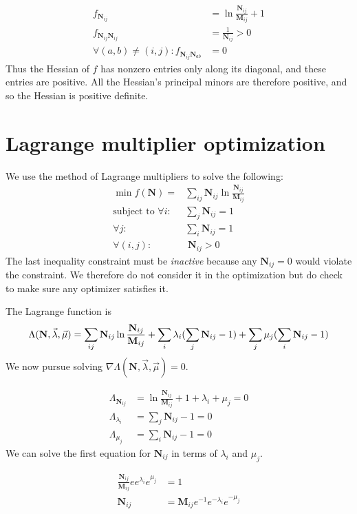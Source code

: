 \documentclass[10pt,a4paper]{article}
\newcommand{\matr}[1]{\mathbf{#1}} %
\DeclarePairedDelimiter{\paren}{(}{)}
\begin{document}
\begin{align*}
f_{\matr{N}_{ij}} &= \ln{\frac{\matr{N}_{ij}}{\matr{M}_{ij}}} + 1 \\
f_{\matr{N}_{ij}\matr{N}_{ij}} &= \frac{1}{\matr{N}_{ij}} > 0\\
\forall (a,b) \neq (i,j): f_{\matr{N}_{ij}\matr{N}_{ab}} &= 0
\end{align*}
Thus the Hessian of $f$ has nonzero entries only along its diagonal, and these entries are positive.
All the Hessian's principal minors are therefore positive, and so the Hessian is positive definite.

\section{Lagrange multiplier optimization}
We use the method of Lagrange multipliers to solve the following:
\begin{align*}
\min f(\matr{N}) = &\sum_{ij} \matr{N}_{ij} \ln \frac{\matr{N}_{ij}}{\matr{M}_{ij}} \\
\text{subject to } \forall i: &\sum_j \matr{N}_{ij} = 1 \\
\forall j: &\sum_i \matr{N}_{ij} = 1 \\
\forall (i,j): &\;\matr{N}_{ij} > 0
\end{align*}
The last inequality constraint must be \textit{inactive} because any $\matr{N}_{ij} = 0$
would violate the constraint. We therefore do not consider it in the optimization
but do check to make sure any optimizer satisfies it.

The Lagrange function is 
\[
\Lambda(\matr{N},\vec{\lambda}, \vec{\mu}) = 
\sum_{ij} \matr{N}_{ij} \ln \frac{\matr{N}_{ij}}{\matr{M}_{ij}} 
+ \sum_i \lambda_i \paren{\sum_j \matr{N}_{ij} - 1}
+ \sum_j \mu_j \paren{\sum_i \matr{N}_{ij} - 1}
\]
We now pursue solving $\nabla \Lambda(\matr{N},\vec{\lambda}, \vec{\mu}) = 0$.

\begin{align*}
\Lambda_{\matr{N}_{ij}} &= \ln{\frac{\matr{N}_{ij}}{\matr{M}_{ij}}} + 1 
+ \lambda_{i} + \mu_j = 0 \\
\Lambda_{\lambda_i} &= \sum_j \matr{N}_{ij} - 1 = 0 \\
\Lambda_{\mu_j} &= \sum_i \matr{N}_{ij} - 1 = 0
\end{align*}
We can solve the first equation for $\matr{N}_{ij}$ in terms of $\lambda_i$ and $\mu_j$.

\begin{align*}
\frac{\matr{N}_{ij}}{\matr{M}_{ij}} ee^{\lambda_i}e^{\mu_j} &= 1 \\
\matr{N}_{ij} &= \matr{M}_{ij} e^{-1}e^{-\lambda_i}e^{-\mu_j}
\end{align*}
\end{document}
